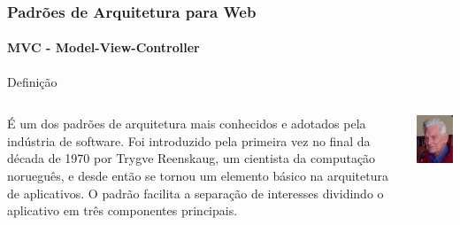 \documentclass[
	10pt, %
	t, %
]{beamer}
\begin{document}
\begin{frame}
	\frametitle{Padrões de Arquitetura para Web}
	\framesubtitle{MVC - Model-View-Controller}

	\begin{block}{Definição}
	\begin{columns}[c] %
			\begin{column}{0.8\textwidth} %
				É um dos padrões de arquitetura mais conhecidos e adotados pela indústria de software. Foi introduzido pela primeira vez no final da década de 1970 por Trygve Reenskaug, um cientista da computação norueguês, e desde então se tornou um elemento básico na arquitetura de aplicativos. O padrão facilita a separação de interesses dividindo o aplicativo em três componentes principais.
			\end{column}

			\begin{column}{0.2\textwidth} %
				\includegraphics[width=0.9\linewidth]{Images/reenskaug.jpg}
			\end{column}
		\end{columns}
	\end{block}

\end{frame}
\end{document}
